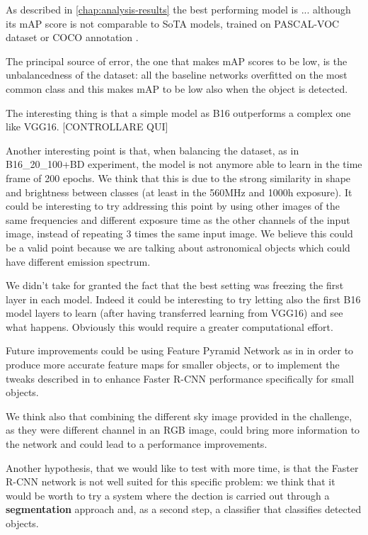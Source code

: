 \documentclass[a4paper,10pt]{report}
\begin{document}
As described in \ref{chap:analysis-results} the best performing model is ...
although its mAP score is not comparable to SoTA models, trained on PASCAL-VOC dataset or COCO annotation \cite{faster-rcnn}.

The principal source of error, the one that makes mAP scores to be low, is the unbalancedness of the dataset: all the baseline networks overfitted on the most common class and this makes mAP to be low also when the object is detected.

The interesting thing is that a simple model as B16 outperforms a complex one like VGG16. [CONTROLLARE QUI]

Another interesting point is that, when balancing the dataset, as in B16\_20\_100+BD experiment, the model is not anymore able to learn in the time frame of 200 epochs. We think that this is due to the strong similarity in shape and brightness between classes (at least in the 560MHz and 1000h exposure). It could be interesting to try addressing this point by using other images of the same frequencies and different exposure time as the other channels of the input image, instead of repeating 3 times the same input image. We believe this could be a valid point because we are talking about astronomical objects which could have different emission spectrum.

We didn't take for granted the fact that the best setting was freezing the first layer in each model. Indeed it could be interesting to try letting also the first B16 model layers to learn (after having transferred learning from VGG16) and see what happens. Obviously this would require a greater computational effort.

Future improvements could be using Feature Pyramid Network as in \cite{fpn} in order to produce more accurate feature maps for smaller objects, or to implement the tweaks described in \cite{frcnn-small-obj} to enhance Faster R-CNN performance specifically for small objects.

We think also that combining the different sky image provided in the challenge, as they were different channel in an RGB image, could bring more information to the network and could lead to a performance improvements.

Another hypothesis, that we would like to test with more time, is that the Faster R-CNN network is not well suited for this specific problem: we think that it would be worth to try a system where the dection is carried out through a \textbf{segmentation} approach and, as a second step, a classifier that classifies detected objects.

\printbibliography
\end{document}
